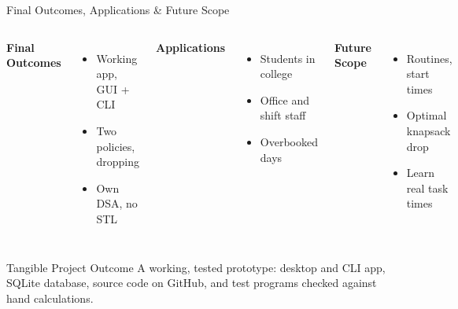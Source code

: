 \documentclass[aspectratio=169,11pt]{beamer}
\begin{document}
\begin{frame}{Final Outcomes, Applications \& Future Scope}

\begin{columns}[T,totalwidth=\textwidth]


\textbf{\color{GEUBlue}Final Outcomes}

\begin{itemize}\itemsep3pt
    \item Working app, GUI + CLI
    \item Two policies, dropping
    \item Own DSA, no STL
\end{itemize}


\textbf{\color{GEUBlue}Applications}

\begin{itemize}\itemsep3pt
    \item Students in college
    \item Office and shift staff
    \item Overbooked days
\end{itemize}


\textbf{\color{GEUBlue}Future Scope}

\begin{itemize}\itemsep3pt
    \item Routines, start times
    \item Optimal knapsack drop
    \item Learn real task times
\end{itemize}

\end{columns}

\vspace{5mm}

\begin{block}{Tangible Project Outcome}
A working, tested prototype: desktop and CLI app, SQLite database, source code on GitHub,
and test programs checked against hand calculations.
\end{block}

\end{frame}
\end{document}

